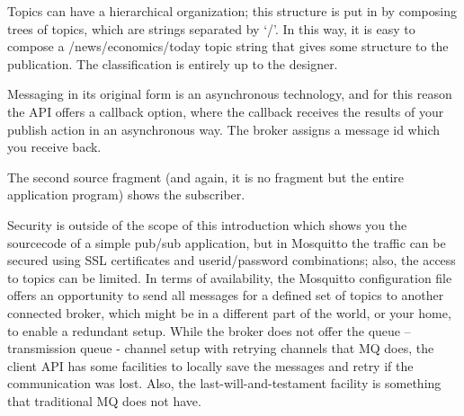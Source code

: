 
 
Topics can have a hierarchical organization; this structure is put in by composing trees of topics, which are strings separated by ‘/’. In this way, it is easy to compose a /news/economics/today topic string that gives some structure to the publication. The classification is entirely up to the designer.
 
Messaging in its original form is an asynchronous technology, and for this reason the API offers a callback option, where the callback receives the results of your publish action in an asynchronous way. The broker assigns a message id which you receive back.
 
 
The second source fragment (and again, it is no fragment but the entire application program) shows the subscriber.
 

  
Security is outside of the scope of this introduction which shows you the sourcecode of a simple pub/sub application, but in Mosquitto the traffic can be secured using SSL certificates and userid/password combinations; also, the access to topics can be limited. In terms of availability, the Mosquitto configuration file offers an opportunity to send all messages for a defined set of topics to another connected broker, which might be in a different part of the world, or your home, to enable a redundant setup. While the broker does not offer the queue – transmission queue - channel setup with retrying channels that MQ does, the client API has some facilities to locally save the messages and retry if the communication was lost. Also, the last-will-and-testament facility is something that traditional MQ does not have.
 
 

